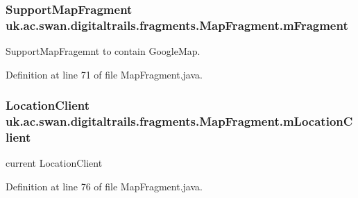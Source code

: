 \hypertarget{classuk_1_1ac_1_1swan_1_1digitaltrails_1_1fragments_1_1_map_fragment_a39598ad7b75cd75ef1454af3e394edc6}{
\subsubsection[{m\+Fragment}]{\setlength{\rightskip}{0pt plus 5cm}Support\+Map\+Fragment uk.\+ac.\+swan.\+digitaltrails.\+fragments.\+Map\+Fragment.\+m\+Fragment\hspace{0.3cm}{\ttfamily [protected]}}}\label{classuk_1_1ac_1_1swan_1_1digitaltrails_1_1fragments_1_1_map_fragment_a39598ad7b75cd75ef1454af3e394edc6}


Support\+Map\+Fragemnt to contain Google\+Map. 



Definition at line 71 of file Map\+Fragment.\+java.

\hypertarget{classuk_1_1ac_1_1swan_1_1digitaltrails_1_1fragments_1_1_map_fragment_a906e60065eeb311eb30b372edb2f1447}{
\subsubsection[{m\+Location\+Client}]{\setlength{\rightskip}{0pt plus 5cm}Location\+Client uk.\+ac.\+swan.\+digitaltrails.\+fragments.\+Map\+Fragment.\+m\+Location\+Client\hspace{0.3cm}{\ttfamily [protected]}}}\label{classuk_1_1ac_1_1swan_1_1digitaltrails_1_1fragments_1_1_map_fragment_a906e60065eeb311eb30b372edb2f1447}


current Location\+Client 



Definition at line 76 of file Map\+Fragment.\+java.

